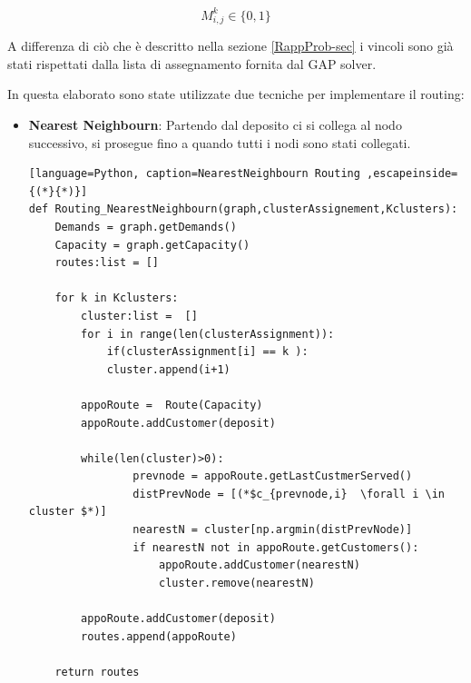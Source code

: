 \documentclass[]{article}
\begin{document}
\begin{equation} \label{}
M_{i,j}^k \in \{0,1\}
\end{equation}

A differenza di ciò che è descritto nella sezione  \ref{RappProb-sec} i vincoli sono già stati rispettati dalla lista di assegnamento fornita dal GAP solver.



In questa elaborato sono state utilizzate due tecniche per implementare il routing:
\begin{itemize}
\item \textbf{Nearest Neighbourn}: Partendo dal deposito ci si collega al nodo successivo, si prosegue fino a quando tutti i nodi sono stati collegati.

\begin{lstlisting}[language=Python, caption=NearestNeighbourn Routing ,escapeinside={(*}{*)}]
def Routing_NearestNeighbourn(graph,clusterAssignement,Kclusters):
	Demands = graph.getDemands()
	Capacity = graph.getCapacity()
	routes:list = []
	
	for k in Kclusters:
		cluster:list =  []
		for i in range(len(clusterAssignment)):
			if(clusterAssignment[i] == k ):
			cluster.append(i+1)
				
		appoRoute =  Route(Capacity) 
		appoRoute.addCustomer(deposit)
			
	    while(len(cluster)>0):
				prevnode = appoRoute.getLastCustmerServed()
				distPrevNode = [(*$c_{prevnode,i}  \forall i \in cluster $*)]
				nearestN = cluster[np.argmin(distPrevNode)] 
				if nearestN not in appoRoute.getCustomers():
					appoRoute.addCustomer(nearestN)
					cluster.remove(nearestN)
			
		appoRoute.addCustomer(deposit)
		routes.append(appoRoute)
			
	return routes


\end{lstlisting}
\end{itemize}
\end{document}
